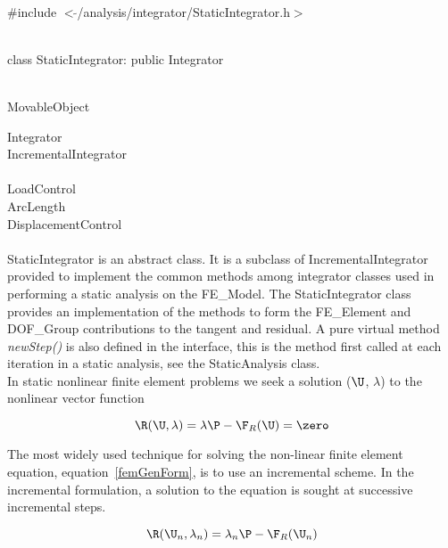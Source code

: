 
   \\
\#include $<\tilde{ }$/analysis/integrator/StaticIntegrator.h$>$  


  \\
class StaticIntegrator: public Integrator  


 \\
MovableObject 

\indent\indent Integrator \\
\indent\indent\indent IncrementalIntegrator \\
\indent\indent\indent{} \\
\indent\indent\indent\indent\indent LoadControl \\
\indent\indent\indent\indent\indent ArcLength \\
\indent\indent\indent\indent\indent DisplacementControl \\

 \\ 
\indent StaticIntegrator is an abstract class. It is a subclass of
IncrementalIntegrator provided to implement the common methods among
integrator classes used in performing a static analysis on the
FE\_Model. The StaticIntegrator class provides an implementation of
the methods to form the FE\_Element and DOF\_Group contributions to
the tangent and residual. A pure virtual method {\em newStep()} is
also defined in the interface, this is the method first called at each
iteration in a static analysis, see the StaticAnalysis class. \\

In static nonlinear finite element problems we seek a solution
($\U$, $\lambda$) to the nonlinear vector function

\begin{equation}
\R(\U, \lambda) = \lambda \P - \F_R(\U) = \zero
\label{staticGenForm}
\end{equation}

The most widely used technique for solving the non-linear finite
element equation, equation~\ref{femGenForm}, is to use an incremental
scheme. In the incremental formulation, a solution to the equation is
sought at successive incremental steps.  

\begin{equation}
\R(\U_{n}, \lambda_n) = \lambda_n \P - \F_R(\U_{n})
\label{staticIncForm}
\end{equation}


